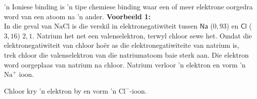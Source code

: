 \label{m38684*fhsst!!!underscore!!!id456}
 { 'n Ioniese binding is 'n tipe chemiese binding waar een of meer elektrone oorgedra word van een atoom na  'n ander.} 
        \label{m38684*id142248}
          \textbf{Voorbeeld 1:}\\
In die geval van $\text{NaCl}$ is die verskil in elektronegatiwiteit tussen $\textsf{Na}$ ($0,93$) en $\textsf{Cl}$ ($3,16$)  $2,1$. Natrium het net een valenselektron, terwyl chloor sewe het. Omdat die elektronegatiwiteit
van chloor hoër as die elektronegatiwiteite van natrium is,  trek chloor die valenselektron
van die natriumatoom baie sterk aan. Die elektron word oorgeplaas van natrium na chloor. Natrium
verloor 'n elektron en vorm 'n ${\text{Na}}^{+}$ ioon.\\
  \par
Chloor kry  'n elektron by en vorm 'n ${\text{Cl}}^{-}$-ioon. \\
  \par

